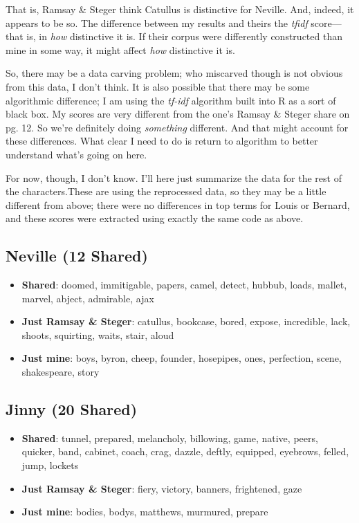 \documentclass[
  12pt,
]{article}
\providecommand{\tightlist}{%
  \setlength{\itemsep}{0pt}\setlength{\parskip}{0pt}}
\begin{document}
That is, Ramsay \& Steger think Catullus is distinctive for Neville.
And, indeed, it appears to be so. The difference between my results and
theirs the \emph{tfidf} score---that is, in \emph{how} distinctive it
is. If their corpus were differently constructed than mine in some way,
it might affect \emph{how} distinctive it is.

So, there may be a data carving problem; who miscarved though is not
obvious from this data, I don't think. It is also possible that there
may be some algorithmic difference; I am using the \emph{tf-idf}
algorithm built into R as a sort of black box. My scores are very
different from the one's Ramsay \& Steger share on pg. 12. So we're
definitely doing \emph{something} different. And that might account for
these differences. What clear I need to do is return to algorithm to
better understand what's going on here.

For now, though, I don't know. I'll here just summarize the data for the
rest of the characters.{These are using the reprocessed data, so they
may be a little different from above; there were no differences in top
terms for Louis or Bernard, and these scores were extracted using
exactly the same code as above.}

\hypertarget{neville-12-shared}{%
\subsection{Neville (12 Shared)}\label{neville-12-shared}}

\begin{itemize}
\tightlist
\item
  \textbf{Shared}: doomed, immitigable, papers, camel, detect, hubbub,
  loads, mallet, marvel, abject, admirable, ajax
\item
  \textbf{Just Ramsay \& Steger}: catullus, bookcase, bored, expose,
  incredible, lack, shoots, squirting, waits, stair, aloud
\item
  \textbf{Just mine}: boys, byron, cheep, founder, hosepipes, ones,
  perfection, scene, shakespeare, story
\end{itemize}

\hypertarget{jinny-20-shared}{%
\subsection{Jinny (20 Shared)}\label{jinny-20-shared}}

\begin{itemize}
\tightlist
\item
  \textbf{Shared}: tunnel, prepared, melancholy, billowing, game,
  native, peers, quicker, band, cabinet, coach, crag, dazzle, deftly,
  equipped, eyebrows, felled, jump, lockets
\item
  \textbf{Just Ramsay \& Steger}: fiery, victory, banners, frightened,
  gaze
\item
  \textbf{Just mine}: bodies, bodys, matthews, murmured, prepare
\end{itemize}
\end{document}
